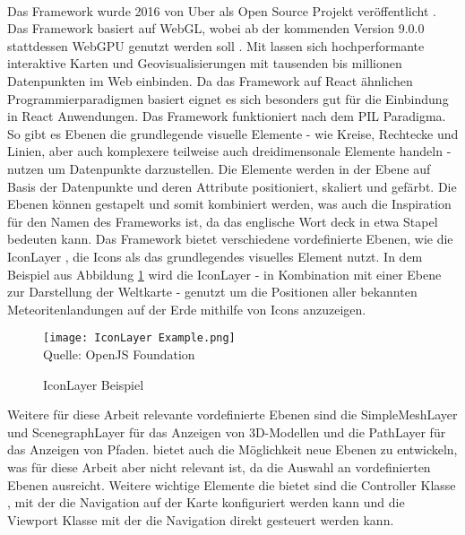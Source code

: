 \paragraph{\deckgl{}}
Das Framework \deckgl{} wurde 2016 von Uber als Open Source Projekt veröffentlicht \cite{Visgl}. Das Framework basiert auf \ac{WebGL}, wobei ab der kommenden Version 9.0.0 stattdessen WebGPU genutzt werden soll \cite{Green2022}. Mit \deckgl{} lassen sich hochperformante interaktive Karten und Geovisualisierungen mit tausenden bis millionen Datenpunkten im Web einbinden. Da das Framework auf React ähnlichen Programmierparadigmen basiert eignet es sich besonders gut für die Einbindung in React Anwendungen. Das Framework funktioniert nach dem \ac{PIL} Paradigma. So gibt es Ebenen die grundlegende visuelle Elemente - wie Kreise, Rechtecke und Linien, aber auch komplexere teilweise auch dreidimensonale Elemente handeln - nutzen um Datenpunkte darzustellen. Die Elemente werden in der Ebene auf Basis der Datenpunkte und deren Attribute positioniert, skaliert und gefärbt. Die Ebenen können gestapelt und somit kombiniert werden, was auch die Inspiration für den Namen des Frameworks ist, da das englische Wort deck in etwa Stapel bedeuten kann.\cite[S.~2]{YangWang2019} Das Framework bietet verschiedene vordefinierte Ebenen, wie die IconLayer \cite{DeckglIconLayer}, die Icons als das grundlegendes visuelles Element nutzt. In dem Beispiel aus Abbildung \ref{fig:IconLayerExample} wird die IconLayer - in Kombination mit einer Ebene zur Darstellung der Weltkarte - genutzt um die Positionen aller bekannten Meteoritenlandungen auf der Erde mithilfe von Icons anzuzeigen.

\begin{figure}[H]
    \caption{IconLayer Beispiel}\label{fig:IconLayerExample}
    \texttt{[image: IconLayer Example.png]}
    \\
    Quelle: OpenJS Foundation \cite{DeckGlMeteorites}
\end{figure}

Weitere für diese Arbeit relevante vordefinierte Ebenen sind die SimpleMeshLayer \cite{DeckglSimpleMeshLayer} und ScenegraphLayer \cite{DeckglScenegraphLayer} für das Anzeigen von 3D-Modellen und die PathLayer für das Anzeigen von Pfaden. \deckgl bietet auch die Möglichkeit neue Ebenen zu entwickeln, was für diese Arbeit aber nicht relevant ist, da die Auswahl an vordefinierten Ebenen ausreicht. Weitere wichtige Elemente die \deckgl{} bietet sind die Controller Klasse \cite{DeckglController}, mit der die Navigation auf der Karte konfiguriert werden kann und die Viewport Klasse \cite{DeckglViewport} mit der die Navigation direkt gesteuert werden kann.

